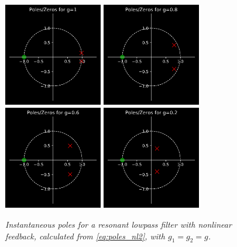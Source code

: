 \documentclass[twoside,a4paper]{article}
\begin{document}
\begin{figure}[!ht]
    \includegraphics[width=1.7in]{../../NonlinearFeedback/Pics/pz1.png}
    \includegraphics[width=1.7in]{../../NonlinearFeedback/Pics/pz08.png}
    \includegraphics[width=1.7in]{../../NonlinearFeedback/Pics/pz06.png}
    \includegraphics[width=1.7in]{../../NonlinearFeedback/Pics/pz02.png}
    \caption{\label{pzPlots2}{\it Instantaneous poles for a resonant
                                lowpass filter with nonlinear feedback,
                                calculated from \cref{eq:poles_nl2},
                                with $g_1 = g_2 = g$.}}
\end{figure}
%
\end{document}

